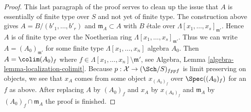 \begin{proof}
\medskip\noindent
This last paragraph of the proof serves to clean up the issue that $A$ is
essentially of finite type over $S$ and not yet of finite type.
The construction above gives $A = B/(b'_1, \ldots, b'_r)$ and
$\mathfrak m_A \subset A$ with $B$ \'etale over
$\Lambda[x_1, \ldots, x_s]_{\mathfrak m'}$. Hence $A$ is of finite
type over the Noetherian ring $\Lambda[x_1, \ldots, x_s]_{\mathfrak m'}$.
Thus we can write $A = (A_0)_{\mathfrak m'}$ for some finite type
$\Lambda[x_1, \ldots, x_n]$ algebra $A_0$. Then
$A = \colim (A_0)_f$ where
$f \in \Lambda[x_1, \ldots, x_n] \setminus \mathfrak m'$, see
Algebra, Lemma \ref{algebra-lemma-localization-colimit}.
Because $p : \mathcal{X} \to (\Sch/S)_{fppf}$ is limit preserving on
objects, we see that
$x_A$ comes from some object $x_{(A_0)_f}$ over $\Spec((A_0)_f)$ for
an $f$ as above. After replacing $A$ by $(A_0)_f$ and $x_A$ by
$x_{(A_0)_f}$ and $\mathfrak m_A$ by $(A_0)_f \cap \mathfrak m_A$
the proof is finished.
\end{proof}
